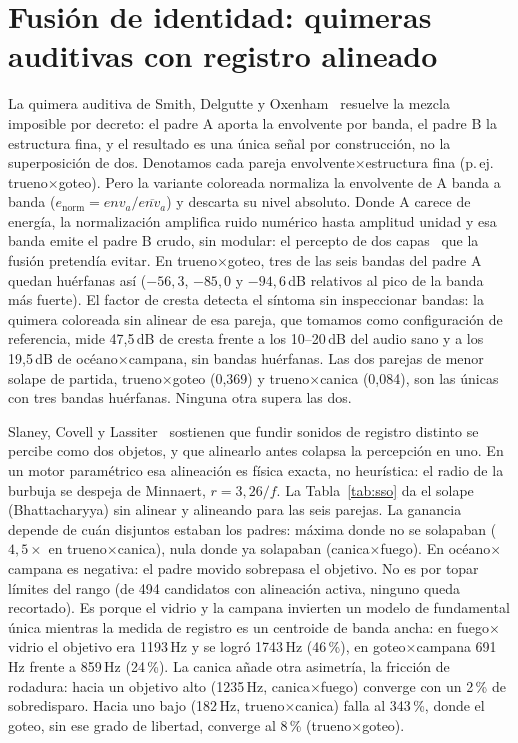 \documentclass[a4paper,11pt,twoside]{article}
\begin{document}
\section{Fusión de identidad: quimeras auditivas con registro alineado}
\label{sec:fusion}

La quimera auditiva de Smith, Delgutte y Oxenham~\cite{smith2002chimeras} resuelve la mezcla imposible por decreto: el padre A aporta la envolvente por banda, el padre B la estructura fina, y el resultado es una única señal por construcción, no la superposición de dos. Denotamos cada pareja envolvente$\times$estructura fina (p.\,ej. trueno$\times$goteo). Pero la variante coloreada normaliza la envolvente de A banda a banda ($e_\mathrm{norm} = env_a / \overline{env_a}$) y descarta su nivel absoluto. Donde A carece de energía, la normalización amplifica ruido numérico hasta amplitud unidad y esa banda emite el padre B crudo, sin modular: el percepto de dos capas~\cite{bregman1990asa} que la fusión pretendía evitar. En trueno$\times$goteo, tres de las seis bandas del padre A quedan huérfanas así ($-56,3$, $-85,0$ y $-94,6$\,dB relativos al pico de la banda más fuerte). El factor de cresta detecta el síntoma sin inspeccionar bandas: la quimera coloreada sin alinear de esa pareja, que tomamos como configuración de referencia, mide 47,5\,dB de cresta frente a los 10--20\,dB del audio sano y a los 19,5\,dB de océano$\times$campana, sin bandas huérfanas. Las dos parejas de menor solape de partida, trueno$\times$goteo (0,369) y trueno$\times$canica (0,084), son las únicas con tres bandas huérfanas. Ninguna otra supera las dos.

Slaney, Covell y Lassiter~\cite{slaney1996morph} sostienen que fundir sonidos de registro distinto se percibe como dos objetos, y que alinearlo antes colapsa la percepción en uno. En un motor paramétrico esa alineación es física exacta, no heurística: el radio de la burbuja se despeja de Minnaert, $r=3,26/f$. La Tabla~\ref{tab:sso} da el solape (Bhattacharyya) sin alinear y alineando para las seis parejas. La ganancia depende de cuán disjuntos estaban los padres: máxima donde no se solapaban ($4,5\times$ en trueno$\times$canica), nula donde ya solapaban (canica$\times$fuego). En océano$\times$campana es negativa: el padre movido sobrepasa el objetivo. No es por topar límites del rango (de 494 candidatos con alineación activa, ninguno queda recortado). Es porque el vidrio y la campana invierten un modelo de fundamental única mientras la medida de registro es un centroide de banda ancha: en fuego$\times$vidrio el objetivo era 1193\,Hz y se logró 1743\,Hz (46\,\%), en goteo$\times$campana 691\,Hz frente a 859\,Hz (24\,\%). La canica añade otra asimetría, la fricción de rodadura: hacia un objetivo alto (1235\,Hz, canica$\times$fuego) converge con un 2\,\% de sobredisparo. Hacia uno bajo (182\,Hz, trueno$\times$canica) falla al 343\,\%, donde el goteo, sin ese grado de libertad, converge al 8\,\% (trueno$\times$goteo).
\end{document}
